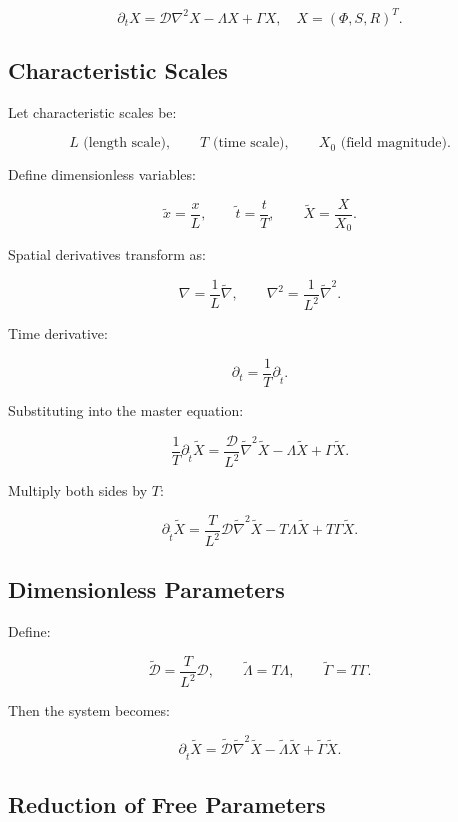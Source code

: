 \documentclass[12pt,a4paper]{article}
\theoremstyle{definition}
\begin{document}
\[
\partial_t X
=
\mathcal{D} \nabla^2 X
-
\Lambda X
+
\Gamma X,
\quad X = (\Phi,S,R)^T.
\]

\subsection*{Characteristic Scales}

Let characteristic scales be:

\[
L \text{ (length scale)}, \qquad
T \text{ (time scale)}, \qquad
X_0 \text{ (field magnitude)}.
\]

Define dimensionless variables:

\[
\tilde{x} = \frac{x}{L},
\qquad
\tilde{t} = \frac{t}{T},
\qquad
\tilde{X} = \frac{X}{X_0}.
\]

Spatial derivatives transform as:

\[
\nabla = \frac{1}{L} \tilde{\nabla},
\qquad
\nabla^2 = \frac{1}{L^2} \tilde{\nabla}^2.
\]

Time derivative:

\[
\partial_t = \frac{1}{T} \partial_{\tilde{t}}.
\]

Substituting into the master equation:

\[
\frac{1}{T} \partial_{\tilde{t}} \tilde{X}
=
\frac{\mathcal{D}}{L^2} \tilde{\nabla}^2 \tilde{X}
-
\Lambda \tilde{X}
+
\Gamma \tilde{X}.
\]

Multiply both sides by $T$:

\[
\partial_{\tilde{t}} \tilde{X}
=
\frac{T}{L^2} \mathcal{D} \tilde{\nabla}^2 \tilde{X}
-
T \Lambda \tilde{X}
+
T \Gamma \tilde{X}.
\]

\subsection*{Dimensionless Parameters}

Define:

\[
\tilde{\mathcal{D}} = \frac{T}{L^2} \mathcal{D},
\qquad
\tilde{\Lambda} = T \Lambda,
\qquad
\tilde{\Gamma} = T \Gamma.
\]

Then the system becomes:

\[
\partial_{\tilde{t}} \tilde{X}
=
\tilde{\mathcal{D}} \tilde{\nabla}^2 \tilde{X}
-
\tilde{\Lambda} \tilde{X}
+
\tilde{\Gamma} \tilde{X}.
\]

\subsection*{Reduction of Free Parameters}
\end{document}
